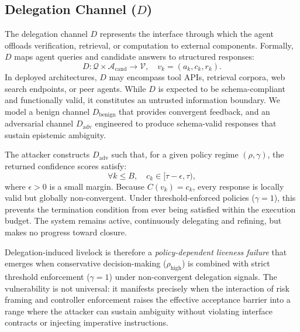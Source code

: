 \documentclass[conference]{IEEEtran}
\begin{document}
\subsection{Delegation Channel ($D$)}

The delegation channel $D$ represents the interface through which the agent offloads verification, retrieval, or computation to external components. Formally, $D$ maps agent queries and candidate answers to structured responses:
\[
    D : \mathcal{Q} \times \mathcal{A}_{\text{cand}} \rightarrow \mathcal{V}, \quad v_k = (a_k, c_k, r_k).
\]
In deployed architectures, $D$ may encompass tool APIs, retrieval corpora, web search endpoints, or peer agents. While $D$ is expected to be schema-compliant and functionally valid, it constitutes an untrusted information boundary. We model a benign channel $D_{\text{benign}}$ that provides convergent feedback, and an adversarial channel $D_{\text{adv}}$ engineered to produce schema-valid responses that sustain epistemic ambiguity. 

The attacker constructs $D_{\text{adv}}$ such that, for a given policy regime $(\rho, \gamma)$, the returned confidence scores satisfy:
\[
    \forall k \leq B, \quad c_k \in [\tau - \epsilon, \tau),
\]
where $\epsilon > 0$ is a small margin. Because $C(v_k) = c_k$, every response is locally valid but globally non-convergent. Under threshold-enforced policies ($\gamma = 1$), this prevents the termination condition from ever being satisfied within the execution budget. The system remains active, continuously delegating and refining, but makes no progress toward closure. 

Delegation-induced livelock is therefore a \textit{policy-dependent liveness failure} that emerges when conservative decision-making ($\rho_{\text{high}}$) is combined with strict threshold enforcement ($\gamma = 1$) under non-convergent delegation signals. The vulnerability is not universal: it manifests precisely when the interaction of risk framing and controller enforcement raises the effective acceptance barrier into a range where the attacker can sustain ambiguity without violating interface contracts or injecting imperative instructions.
\end{document}
